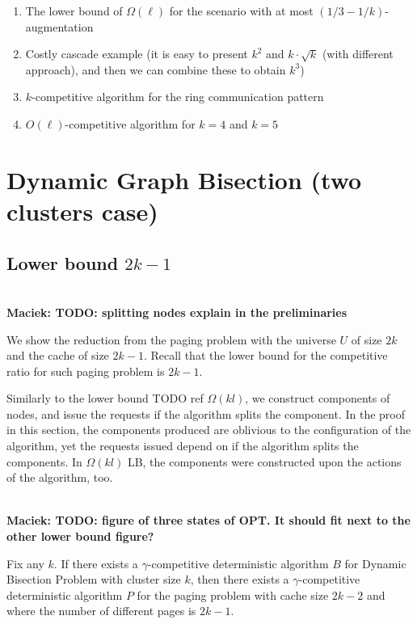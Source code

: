 \documentclass[manuscript,screen=true, review, anonymous]{acmart}
\newcommand\maciek[1]{\color{brown}\textbf{\\ Maciek: #1}\color{black}}
\begin{document}
\begin{enumerate}
  		 \item The lower bound of $\Omega(\ell)$ for the scenario with at most $(1/3-1/k)$-augmentation
  
  		 \item Costly cascade example (it is easy to present $k^2$ and $k\cdot \sqrt{k}$ (with different approach), and then we can combine these to obtain $k^3$)
  
  		 \item $k$-competitive algorithm for the ring communication pattern
  
  		 \item $O(\ell)$-competitive algorithm for $k=4$ and $k=5$
  
  \end{enumerate}

\section{Dynamic Graph Bisection (two clusters case)}

\subsection{Lower bound $2k-1$}

\maciek{TODO: splitting nodes explain in the preliminaries}

We show the reduction from the paging problem with the universe $U$ of size $2k$ and the cache of size $2k-1$.
Recall that the lower bound for the competitive ratio for such paging problem is $2k-1$.

Similarly to the lower bound TODO ref $\Omega(kl)$, we construct components of nodes, and issue the requests if the algorithm splits the component.
In the proof in this section, the components produced are oblivious to the configuration of the algorithm, yet the requests issued depend on if the algorithm splits the components. In $\Omega(kl)$ LB, the components were constructed upon the actions of the algorithm, too.

\maciek{TODO: figure of three states of OPT. It should fit next to the other lower bound figure?}

\begin{theorem}

  Fix any $k$. If there exists a $\gamma$-competitive deterministic algorithm $B$ for Dynamic Bisection Problem with cluster size $k$, then there exists a $\gamma$-competitive deterministic algorithm $P$ for the paging problem with cache size $2k-2$ and where the number of different pages is $2k-1$. 
\end{theorem}
\end{document}
